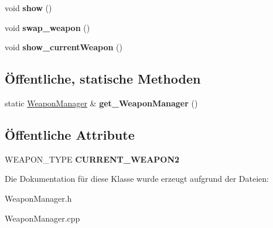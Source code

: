 \begin{DoxyCompactItemize}
\item 
\hypertarget{class_weapon_manager_ab9c945db9e377562d05493f9474ec499}{void {\bfseries show} ()}\label{class_weapon_manager_ab9c945db9e377562d05493f9474ec499}

\item 
\hypertarget{class_weapon_manager_ad2d37307f38fc2ae493d0ee804c9842f}{void {\bfseries swap\-\_\-weapon} ()}\label{class_weapon_manager_ad2d37307f38fc2ae493d0ee804c9842f}

\item 
\hypertarget{class_weapon_manager_a815b728b877f0f1fefceec97c1a6a7e9}{void {\bfseries show\-\_\-current\-Weapon} ()}\label{class_weapon_manager_a815b728b877f0f1fefceec97c1a6a7e9}

\end{DoxyCompactItemize}
\subsection*{Öffentliche, statische Methoden}
\begin{DoxyCompactItemize}
\item 
\hypertarget{class_weapon_manager_a43dc0489aed7aad37a65a0e6d687f06c}{static \hyperlink{class_weapon_manager}{Weapon\-Manager} \& {\bfseries get\-\_\-\-Weapon\-Manager} ()}\label{class_weapon_manager_a43dc0489aed7aad37a65a0e6d687f06c}

\end{DoxyCompactItemize}
\subsection*{Öffentliche Attribute}
\begin{DoxyCompactItemize}
\item 
\hypertarget{class_weapon_manager_a25afeaede894545ee2f7d7f9f1ce760d}{W\-E\-A\-P\-O\-N\-\_\-\-T\-Y\-P\-E {\bfseries C\-U\-R\-R\-E\-N\-T\-\_\-\-W\-E\-A\-P\-O\-N2}}\label{class_weapon_manager_a25afeaede894545ee2f7d7f9f1ce760d}

\end{DoxyCompactItemize}


Die Dokumentation für diese Klasse wurde erzeugt aufgrund der Dateien\-:\begin{DoxyCompactItemize}
\item 
Weapon\-Manager.\-h\item 
Weapon\-Manager.\-cpp\end{DoxyCompactItemize}
